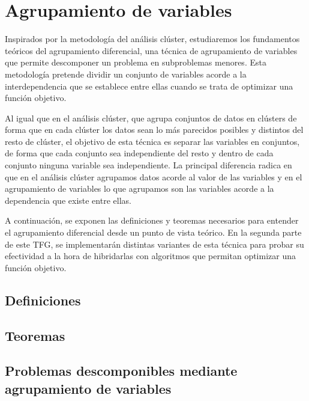 
\chapter{Agrupamiento de variables}

Inspirados por la metodología del análisis clúster, estudiaremos los fundamentos teóricos del agrupamiento diferencial, una técnica de agrupamiento de variables que permite descomponer un problema en subproblemas menores. Esta metodología pretende dividir un conjunto de variables acorde a la interdependencia que se establece entre ellas cuando se trata de optimizar una función objetivo.

Al igual que en el análisis clúster, que agrupa conjuntos de datos en clústers de forma que en cada clúster los datos sean lo más parecidos posibles y distintos del resto de clúster, el objetivo de esta técnica es separar las variables en conjuntos, de forma que cada conjunto sea independiente del resto y dentro de cada conjunto ninguna variable sea independiente. La principal diferencia radica en que en el análisis clúster agrupamos datos acorde al valor de las variables y en el agrupamiento de variables lo que agrupamos son las variables acorde a la dependencia que existe entre ellas. 

A continuación, se exponen las definiciones y teoremas necesarios para entender el agrupamiento diferencial desde un punto de vista teórico. En la segunda parte de este TFG, se implementarán distintas variantes de esta técnica para probar su efectividad a la hora de hibridarlas con algoritmos que permitan optimizar una función objetivo.

\section{Definiciones}


\section{Teoremas}

\section{Problemas descomponibles mediante agrupamiento de variables}


\endinput
